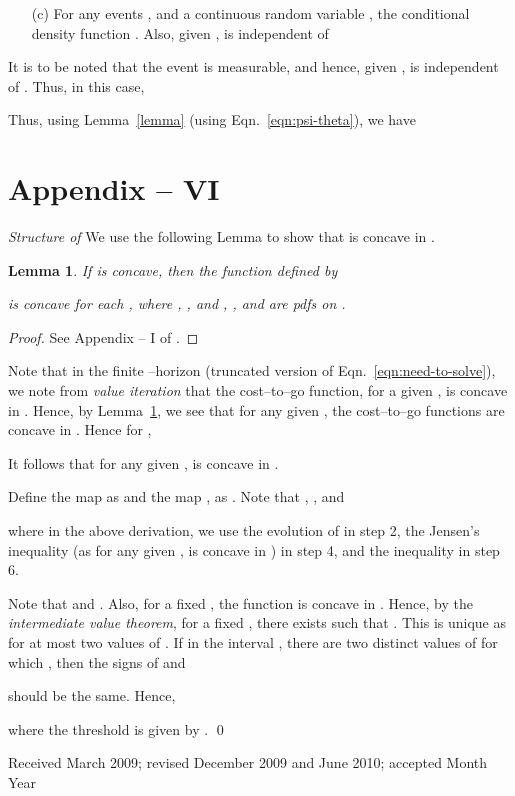 \documentclass[acmtosn]{acmtrans2m}
\newtheorem{lemma}{Lemma}
\begin{document}
\begin{itemize}
\begin{itemize}
\item[(c)] For any events , and a continuous random variable ,
the conditional density
           function . Also,  given , 
 is independent of 

\end{itemize}
It is to be noted that the event  is 
measurable, and hence, given  , 
 is independent of .
Thus, in this case,
{\footnotesize

}


Thus, 
using Lemma~\ref{lemma} (using Eqn.~\ref{eqn:psi-theta}), we have 


\end{itemize}













\section*{Appendix -- VI}
\emph{Structure of }
We use the following Lemma to show that  is concave in
. 
\begin{lemma}\label{Lemma01}
If  is concave, then the function 
 defined by 

is concave for each , where , ,
and  
 , , and  are pdfs on .
\end{lemma}
\begin{proof}
See Appendix -- I of \cite{premkumar-kumar08sleep-wake-scheduling}.
\end{proof}
Note that in the finite --horizon (truncated version of Eqn.~\ref{eqn:need-to-solve}), 
we note from {\em value iteration} that the cost--to--go function, 
for a given ,  is concave in . 
Hence, by  Lemma~\ref{Lemma01}, we see that for any given  ,
the cost--to--go functions    
 are concave in .
Hence for , 

It follows that for any given ,  is concave in .



Define the map  
as  and the map 
, as 
.
Note that , , 
 and 

where in the above derivation, 
we use the evolution of  in step 2, the Jensen's inequality (as
for any given ,  is concave in ) in step 4, and 
the inequality  in step 6. 


Note that   and 
. Also, for a fixed , 
the function  is concave in .
Hence, by the {\em intermediate value theorem}, for a fixed , 
there exists  such that .
This  is unique as  for at most two values of . 
If in the interval , there are two distinct values of  for 
which , then the signs of 
 and

should be the same.
Hence, 

where the threshold  is given by
. \qed




 


\begin{received}
Received March 2009;
revised December 2009 and June 2010; accepted Month Year
\end{received}
\end{document}
